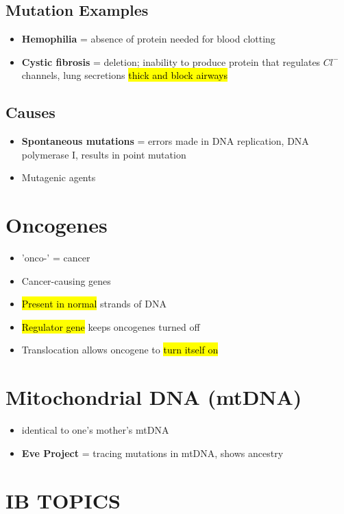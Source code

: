 \documentclass[a4paper,12pt]{article}
\begin{document}
\subsection{Mutation Examples}
\begin{itemize}
    \item{\textbf{Hemophilia} = absence of protein needed for blood clotting}
    \item{\textbf{Cystic fibrosis} = deletion; inability to produce protein that regulates $Cl^-$ channels, lung secretions \hl{thick and block airways}}
\end{itemize}

\subsection{Causes}
\begin{itemize}
    \item{\textbf{Spontaneous mutations} = errors made in DNA replication, DNA polymerase I, results in point mutation}
    \item{Mutagenic agents}
\end{itemize}

\section{Oncogenes}
\begin{itemize}
    \item{'onco-' = cancer}
    \item{Cancer-causing genes}
    \item{\hl{Present in normal} strands of DNA}
    \item{\hl{Regulator gene} keeps oncogenes turned off}
    \item{Translocation allows oncogene to \hl{turn itself on}}
\end{itemize}

\section{Mitochondrial DNA (mtDNA)}
\begin{itemize}
    \item{identical to one's mother's mtDNA}
    \item{\textbf{Eve Project} = tracing mutations in mtDNA, shows ancestry}
\end{itemize}

\pagebreak

\section{IB TOPICS}
\end{document}
